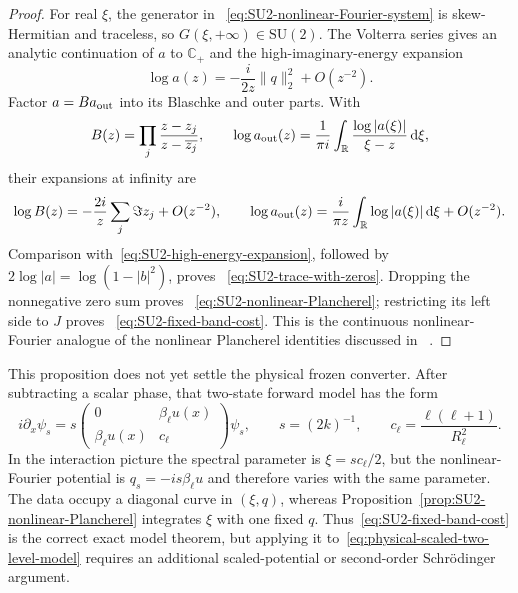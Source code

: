 \documentclass[11pt]{article}
\newcommand{\dd}{\,\mathrm d}
\theoremstyle{definition}
\theoremstyle{remark}
\begin{document}
\begin{proof}
For real $\xi$, the generator in
~\eqref{eq:SU2-nonlinear-Fourier-system} is skew-Hermitian and traceless, so
$G(\xi,+\infty)\in\mathrm{SU}(2)$.  The Volterra series gives an analytic
continuation of $a$ to $\mathbb C_+$ and the high-imaginary-energy expansion
\begin{equation}
 \log a(z)=-\frac{i}{2z}\|q\|_2^2+O(z^{-2}).
 \label{eq:SU2-high-energy-expansion}
\end{equation}
Factor $a=B a_{\rm out}$ into its Blaschke and outer parts.  With
\begin{equation}
 B(z)=\prod_j\frac{z-z_j}{z-\overline{z_j}},
 \qquad
 \log a_{\rm out}(z)=\frac1{\pi i}
 \int_{\mathbb R}\frac{\log|a(\xi)|}{\xi-z}\dd\xi,
\end{equation}
their expansions at infinity are
\begin{equation}
 \log B(z)=-\frac{2i}{z}\sum_j\Im z_j+O(z^{-2}),
 \qquad
 \log a_{\rm out}(z)=\frac{i}{\pi z}
 \int_{\mathbb R}\log|a(\xi)|\dd\xi+O(z^{-2}).
\end{equation}
Comparison with~\eqref{eq:SU2-high-energy-expansion}, followed by
$2\log|a|=\log(1-|b|^2)$, proves
~\eqref{eq:SU2-trace-with-zeros}.  Dropping the nonnegative zero sum proves
~\eqref{eq:SU2-nonlinear-Plancherel}; restricting its left side to $J$ proves
~\eqref{eq:SU2-fixed-band-cost}.  This is the continuous nonlinear-Fourier
analogue of the nonlinear Plancherel identities discussed in
~\cite{TaoThiele2012}.
\end{proof}

This proposition does not yet settle the physical frozen converter.  After
subtracting a scalar phase, that two-state forward model has the form
\begin{equation}
 i\partial_x\psi_s
 =s\begin{pmatrix}0&\beta_\ell u(x)\\
                  \beta_\ell u(x)&c_\ell
   \end{pmatrix}\psi_s,
 \qquad s=(2k)^{-1},\qquad c_\ell=\frac{\ell(\ell+1)}{R_\ell^2}.
 \label{eq:physical-scaled-two-level-model}
\end{equation}
In the interaction picture the spectral parameter is
$\xi=sc_\ell/2$, but the nonlinear-Fourier potential is
$q_s=-is\beta_\ell u$ and therefore varies with the same parameter.  The data
occupy a diagonal curve in $(\xi,q)$, whereas
Proposition~\ref{prop:SU2-nonlinear-Plancherel} integrates $\xi$ with one fixed
$q$.  Thus~\eqref{eq:SU2-fixed-band-cost} is the correct exact model theorem,
but applying it to~\eqref{eq:physical-scaled-two-level-model} requires an
additional scaled-potential or second-order Schr\"odinger argument.
\end{document}
